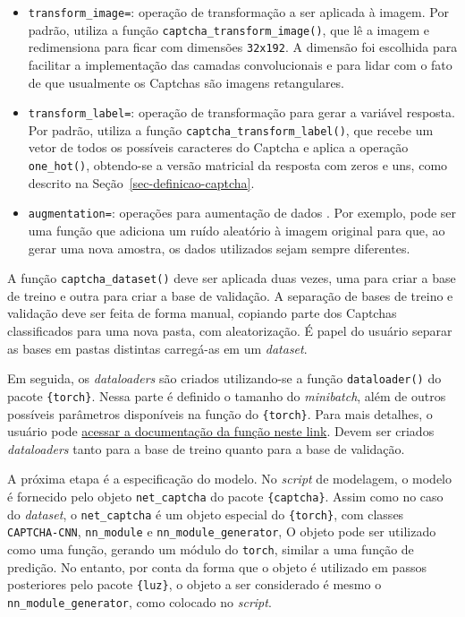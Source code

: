 \documentclass[12pt,twoside,brazilian]{book}
\providecommand{\tightlist}{%
  \setlength{\itemsep}{0pt}\setlength{\parskip}{0pt}}
\begin{document}
\begin{itemize}
\tightlist
\item
  \texttt{transform\_image=}: operação de transformação a ser aplicada à
  imagem. Por padrão, utiliza a função
  \texttt{captcha\_transform\_image()}, que lê a imagem e redimensiona
  para ficar com dimensões \texttt{32x192}. A dimensão foi escolhida
  para facilitar a implementação das camadas convolucionais e para lidar
  com o fato de que usualmente os Captchas são imagens retangulares.
\item
  \texttt{transform\_label=}: operação de transformação para gerar a
  variável resposta. Por padrão, utiliza a função
  \texttt{captcha\_transform\_label()}, que recebe um vetor de todos os
  possíveis caracteres do Captcha e aplica a operação
  \texttt{one\_hot()}, obtendo-se a versão matricial da resposta com
  zeros e uns, como descrito na Seção~\ref{sec-definicao-captcha}.
\item
  \texttt{augmentation=}: operações para aumentação de dados . Por
  exemplo, pode ser uma função que adiciona um ruído aleatório à imagem
  original para que, ao gerar uma nova amostra, os dados utilizados
  sejam sempre diferentes.
\end{itemize}

A função \texttt{captcha\_dataset()} deve ser aplicada duas vezes, uma
para criar a base de treino e outra para criar a base de validação. A
separação de bases de treino e validação deve ser feita de forma manual,
copiando parte dos Captchas classificados para uma nova pasta, com
aleatorização. É papel do usuário separar as bases em pastas distintas
carregá-as em um \emph{dataset}.

Em seguida, os \emph{dataloaders} são criados utilizando-se a função
\texttt{dataloader()} do pacote \texttt{\{torch\}}. Nessa parte é
definido o tamanho do \emph{minibatch}, além de outros possíveis
parâmetros disponíveis na função do \texttt{\{torch\}}. Para mais
detalhes, o usuário pode
\href{https://torch.mlverse.org/docs/reference/dataloader.html}{acessar
a documentação da função neste link}. Devem ser criados
\emph{dataloaders} tanto para a base de treino quanto para a base de
validação.

A próxima etapa é a especificação do modelo. No \emph{script} de
modelagem, o modelo é fornecido pelo objeto \texttt{net\_captcha} do
pacote \texttt{\{captcha\}}. Assim como no caso do \emph{dataset}, o
\texttt{net\_captcha} é um objeto especial do \texttt{\{torch\}}, com
classes \texttt{CAPTCHA-CNN}, \texttt{nn\_module} e
\texttt{nn\_module\_generator}, O objeto pode ser utilizado como uma
função, gerando um módulo do \texttt{torch}, similar a uma função de
predição. No entanto, por conta da forma que o objeto é utilizado em
passos posteriores pelo pacote \texttt{\{luz\}}, o objeto a ser
considerado é mesmo o \texttt{nn\_module\_generator}, como colocado no
\emph{script}.
\end{document}
